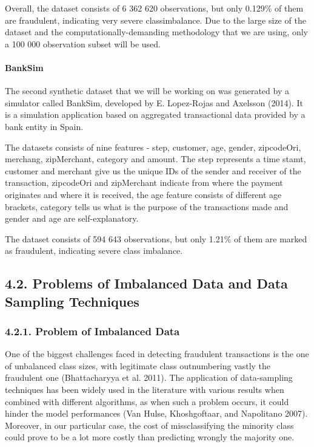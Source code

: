 \documentclass[12pt,]{article}
\let\oldparagraph\paragraph
\renewcommand{\paragraph}[1]{\oldparagraph{#1}\mbox{}}
\begin{document}
Overall, the dataset consists of 6 362 620 observations, but only
0.129\% of them are fraudulent, indicating very severe classimbalance.
Due to the large size of the dataset and the computationally-demanding
methodology that we are using, only a 100 000 observation subset will be
used.

\hypertarget{banksim}{%
\paragraph{BankSim}\label{banksim}}

The second synthetic dataset that we will be working on was generated by
a simulator called BankSim, developed by E. Lopez-Rojas and Axelsson
(2014). It is a simulation application based on aggregated transactional
data provided by a bank entity in Spain.

The datasets consists of nine features - step, customer, age, gender,
zipcodeOri, merchang, zipMerchant, category and amount. The step
represents a time stamt, customer and merchant give us the unique IDs of
the sender and receiver of the transaction, zipcodeOri and zipMerchant
indicate from where the payment originates and where it is received, the
age feature consists of different age brackets, category tells us what
is the purpose of the transactions made and gender and age are
self-explanatory.

The dataset consists of 594 643 observations, but only 1.21\% of them
are marked as fraudulent, indicating severe class imbalance.

\hypertarget{problems-of-imbalanced-data-and-data-sampling-techniques}{%
\subsection{4.2. Problems of Imbalanced Data and Data Sampling
Techniques}\label{problems-of-imbalanced-data-and-data-sampling-techniques}}

\hypertarget{problem-of-imbalanced-data}{%
\subsubsection{4.2.1. Problem of Imbalanced
Data}\label{problem-of-imbalanced-data}}

One of the biggest challenges faced in detecting fraudulent transactions
is the one of unbalanced class sizes, with legitimate class outnumbering
vastly the fraudulent one (Bhattacharyya et al. 2011). The application
of data-sampling techniques has been widely used in the literature with
various results when combined with different algorithms, as when such a
problem occurs, it could hinder the model performances (Van Hulse,
Khoshgoftaar, and Napolitano 2007). Moreover, in our particular case,
the cost of missclassifying the minority class could prove to be a lot
more costly than predicting wrongly the majority one.
\end{document}

